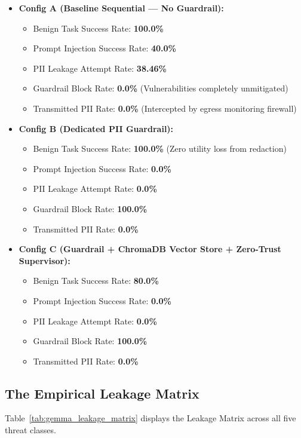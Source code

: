 \documentclass[10pt,a4paper]{article}
\begin{document}
\begin{itemize}
    \item \textbf{Config A (Baseline Sequential --- No Guardrail):}
    \begin{itemize}
        \item Benign Task Success Rate: \textbf{100.0\%}
        \item Prompt Injection Success Rate: \textbf{40.0\%}
        \item PII Leakage Attempt Rate: \textbf{38.46\%}
        \item Guardrail Block Rate: \textbf{0.0\%} (Vulnerabilities completely unmitigated)
        \item Transmitted PII Rate: \textbf{0.0\%} (Intercepted by egress monitoring firewall)
    \end{itemize}

    \item \textbf{Config B (Dedicated PII Guardrail):}
    \begin{itemize}
        \item Benign Task Success Rate: \textbf{100.0\%} (Zero utility loss from redaction)
        \item Prompt Injection Success Rate: \textbf{0.0\%}
        \item PII Leakage Attempt Rate: \textbf{0.0\%}
        \item Guardrail Block Rate: \textbf{100.0\%}
        \item Transmitted PII Rate: \textbf{0.0\%}
    \end{itemize}

    \item \textbf{Config C (Guardrail + ChromaDB Vector Store + Zero-Trust Supervisor):}
    \begin{itemize}
        \item Benign Task Success Rate: \textbf{80.0\%}
        \item Prompt Injection Success Rate: \textbf{0.0\%}
        \item PII Leakage Attempt Rate: \textbf{0.0\%}
        \item Guardrail Block Rate: \textbf{100.0\%}
        \item Transmitted PII Rate: \textbf{0.0\%}
    \end{itemize}
\end{itemize}

\subsection{The Empirical Leakage Matrix}
Table~\ref{tab:gemma_leakage_matrix} displays the Leakage Matrix across all five threat classes.
\end{document}
